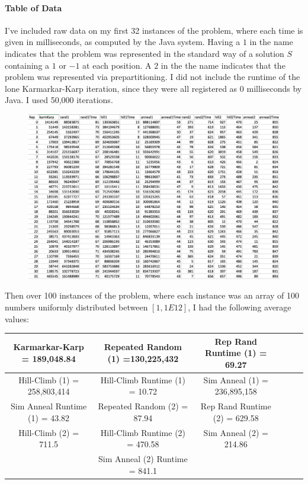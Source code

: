 \documentclass[10.5pt,letter]{article}
\begin{document}
\pagebreak

\paragraph{Table of Data}  I've included raw data on my first 32 instances of the problem, where each time is given in milliseconds, as computed by the Java system. Having a $1$ in the name indicates that the problem was represented in the standard way of a solution $S$ containing a $1$ or $-1$ at each position. A $2$ in the the name indicates that the problem was represented via prepartitioning. I did not include the runtime of the lone Karmarkar-Karp iteration, since they were all registered as $0$ milliseconds by Java. I used 50,000 iterations.

\begin{figure}[h!]
 \centering 
\includegraphics[scale=0.66]{firstThird}
\end{figure}


Then over 100 instances of the problem, where each instance was an array of 100 numbers uniformly distributed between $[1, 1E12]$, I had the following average values: \\


{\setlength{\tabcolsep}{11pt}
\begin{tabular} {|c | c | c | c | c | c | } \hline  
Karmarkar-Karp = 189,048.84 & Repeated Random (1) =130,225,432 & Rep Rand Runtime (1) = 69.27 \\ \hline
Hill-Climb (1) = 258,803,414 & Hill-Climb Runtime (1) = 10.72 & Sim Anneal (1) = 236,895,158 \\ \hline
 Sim Anneal Runtime (1) = 43.82  & Repeated Random (2) = 87.94 & Rep Rand Runtime (2) = 629.58 \\ \hline
 Hill-Climb (2) = 711.5 & Hill-Climb Runtime (2) = 470.58 & Sim Anneal (2) = 214.86 \\ \hline 
 & Sim Anneal (2) Runtime = 841.1 \\ \hline

\end{tabular}} \\ \\
\end{document}

